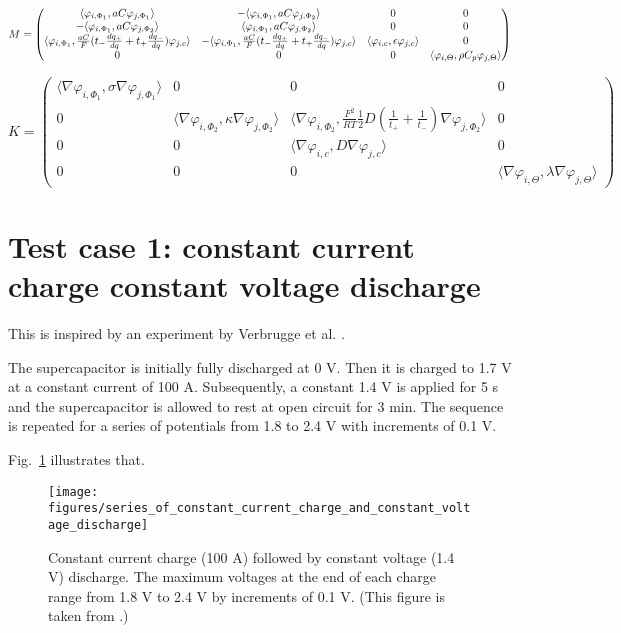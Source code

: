 \documentclass[10pt, oneside]{article}   	%
\begin{document}
\begin{equation}
    M =
    \begin{pmatrix}
        \langle \varphi_{i,\Phi_1}, aC \varphi_{j,\Phi_1} \rangle & -\langle \varphi_{i,\Phi_1}, aC \varphi_{j,\Phi_2} \rangle & 0    & 0    \\
        -\langle \varphi_{i,\Phi_1}, aC \varphi_{j,\Phi_2} \rangle & \langle \varphi_{i,\Phi_1}, aC \varphi_{j,\Phi_2} \rangle & 0    & 0    \\
        \langle \varphi_{i,\Phi_1}, \frac{aC}{F}(t_-\frac{d q_+}{d q} + t_+\frac{d q_-}{d q}) \varphi_{j,c} \rangle & -\langle \varphi_{i,\Phi_1}, \frac{aC}{F}(t_-\frac{d q_+}{d q} + t_+\frac{d q_-}{d q}) \varphi_{j,c} \rangle & \langle \varphi_{i,c}, \epsilon \varphi_{j,c} \rangle & 0    \\
        0    & 0    & 0    & \langle \varphi_{i,\Theta}, \rho C_p \varphi_{j,\Theta} \rangle \\
    \end{pmatrix}
\end{equation}


\newcommand{\Kaa}{\langle \nabla\varphi_{i,\Phi_1}, \sigma \nabla\varphi_{j,\Phi_1} \rangle}
\newcommand{\Kbb}{\langle \nabla\varphi_{i,\Phi_2}, \kappa \nabla\varphi_{j,\Phi_2} \rangle}
\newcommand{\Kbc}{\langle \nabla\varphi_{i,\Phi_2}, \frac{F^2}{RT}\frac12D\left(\frac{1}{t_+}+\frac{1}{t_-}\right) \nabla\varphi_{j,\Phi_2} \rangle}
\newcommand{\Kcc}{\langle \nabla\varphi_{i,c}, D \nabla\varphi_{j,c} \rangle}
\newcommand{\Kdd}{\langle \nabla\varphi_{i,\Theta}, \lambda \nabla\varphi_{j,\Theta} \rangle}
\begin{equation}
    K =
    \begin{pmatrix}
        \Kaa  & 0    & 0    & 0 \\
        0     & \Kbb & \Kbc & 0 \\
        0     & 0    & \Kcc & 0 \\
        0     & 0    & 0    & \Kdd
    \end{pmatrix}
\end{equation}

\newpage
\section{Test case 1: constant current charge constant voltage discharge}
This is inspired by an experiment by Verbrugge et al. \cite{Verbrugge2005}.

The supercapacitor is initially fully discharged at 0 V.  Then it is charged
to 1.7 V at a constant current of 100 A.  Subsequently, a constant 1.4 V is
applied for 5 s and the supercapacitor is allowed to rest at open circuit for
3 min.  The sequence is repeated for a series of potentials from 1.8 to 2.4 V
with increments of 0.1 V.

Fig.~\ref{fig:series_of_constant_current_charge_and_constant_voltage_discharge}
illustrates that.


\begin{figure}[h!]
    \centering
    \texttt{[image: figures/series\_of\_constant\_current\_charge\_and\_constant\_voltage\_discharge]}
    \caption{
Constant current charge (100 A) followed by constant voltage (1.4 V)
discharge.  The maximum voltages at the end of each charge range from 1.8 V to
2.4 V by increments of 0.1 V.  (This figure is taken from \cite{Verbrugge2005}.)
    }
    \label{fig:series_of_constant_current_charge_and_constant_voltage_discharge}
\end{figure}
\end{document}
